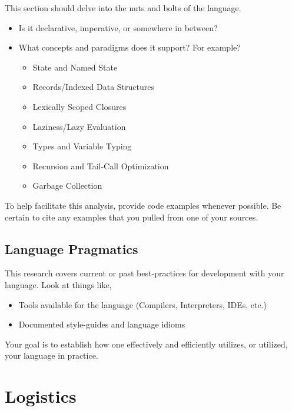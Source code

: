 \documentclass[10pt]{article}
\begin{document}
This section should delve into the nuts and bolts of the language.
\begin{itemize}
\item Is it declarative, imperative, or somewhere in between?
\item What concepts and paradigms does it support? For example?
\begin{itemize}
\item State and Named State
\item Records/Indexed Data Structures
\item Lexically Scoped Closures
\item Laziness/Lazy Evaluation 
\item Types and Variable Typing
\item Recursion and Tail-Call Optimization
\item Garbage Collection
\end{itemize}
\end{itemize}
To help facilitate this analysis, provide code examples whenever possible.  Be certain to cite any examples that you pulled from one of your sources.  

\subsection{Language Pragmatics}

This research covers current or past best-practices for development with your language.  Look at things like,
\begin{itemize}
\item Tools available for the language (Compilers, Interpreters, IDEs, etc.)
\item Documented style-guides and language idioms
\end{itemize}
Your goal is to establish how one effectively and efficiently utilizes, or utilized, your language in practice.  


\section{Logistics}
\end{document}
